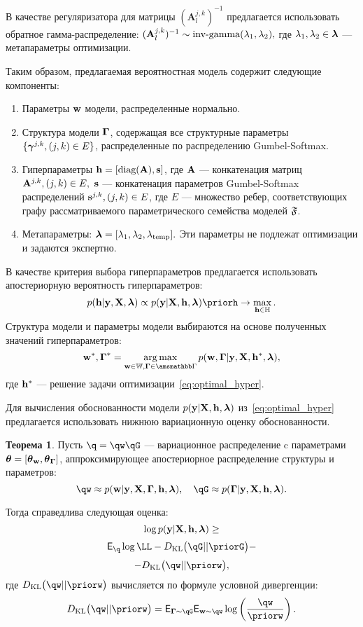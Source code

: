 \documentclass[11pt, a5paper]{dissert}
\theoremstyle{definition}
\newtheorem{theorem}{Теорема}
\DeclareMathOperator*{\argmax}{arg\,max}
\begin{document}
{В качестве регуляризатора для матрицы $(\mathbf{A}^{j,k}_l)^{-1}$ предлагается использовать обратное гамма-распределение:
$
    (\mathbf{A}^{j,k}_l)^{-1} \sim \text{inv-gamma}(\lambda_1,\lambda_2),
$
где $\lambda_1,\lambda_2 \in \boldsymbol{\lambda}$ --- метапараметры оптимизации. 

Таким образом, предлагаемая вероятностная модель содержит следующие компоненты:
\begin{enumerate}
\item Параметры $\mathbf{w}$ модели, распределенные нормально.
\item Структура модели $\boldsymbol{\Gamma}$, содержащая все структурные параметры $\{\boldsymbol{\gamma}^{j,k}, (j,k) \in E\}$, распределенные по распределению Gumbel-Softmax.
\item Гиперпараметры $\mathbf{h} = [\text{diag}(\mathbf{A}), \mathbf{s}]$, где $\mathbf{A}$ --- конкатенация матриц $\mathbf{A}^{j,k}, (j,k) \in E,$ $\mathbf{s}$ --- конкатенация параметров Gumbel-Softmax распределений $\mathbf{s}^{j,k}, (j,k) \in E$, где $E$ --- множество ребер, соответствующих графу рассматриваемого параметрического семейства моделей $\mathfrak{F}$.
\item Метапараметры: $\boldsymbol{\lambda} = [\lambda_1, \lambda_2, \lambda_{\text{temp}}].$ Эти параметры не подлежат оптимизации и задаются экспертно. 
\end{enumerate}

В качестве критерия выбора гиперпараметров предлагается использовать апостериорную вероятность гиперпараметров:
\begin{equation}
\label{eq:optimal_hyper}
    \posth \propto \EV \priorh \to \max_{\h \in \Hb}.
\end{equation}
Структура модели и параметры модели выбираются на основе полученных значений гиперпараметров:
\[
    \w^*,\G^* = \argmax_{\w \in \Wb, \G \in \Gb} p(\w, \G|\y, \X, \h^*, \lam ),
\]
где $\mathbf{h}^*$ --- решение задачи оптимизации~\eqref{eq:optimal_hyper}.

Для вычисления обоснованности модели $p(\mathbf{y}|\mathbf{X}, \mathbf{h},\boldsymbol{\lambda})$ из~\eqref{eq:optimal_hyper} предлагается использовать нижнюю вариационную оценку обоснованности.

\begin{theorem}
Пусть $\q = \qw \qG$ --- вариационное распределение c параметрами $\boldsymbol{\theta}= [\boldsymbol{\theta}_\mathbf{w}, \boldsymbol{\theta}_{\boldsymbol{\Gamma}} ]$, аппроксимирующее апостериорное распределение структуры и параметров:
\[
   \qw  \approx \postw, \quad    \qG \approx \postG.
\]

Тогда справедлива следующая оценка:
\begin{equation}
\label{eq:full_elbo}
\log p(\mathbf{y}|\mathbf{X}, \mathbf{h},\boldsymbol{\lambda}) \geq
\end{equation}
\[
 \E_{\q}  \log \LL - \KL{\qG}{\priorG} - 
\]
\[
 - \KL{\qw}{\priorw},
\]
где $\KL{\qw}{\priorw}$ вычисляется по формуле условной дивергенции:
\[
\KL{\qw}{\priorw} = \E_{\G \sim \qG} \E_{\w \sim \qw} \log \left(\frac{\qw}{\priorw}\right).
\]
\end{theorem}


}
\end{document}
